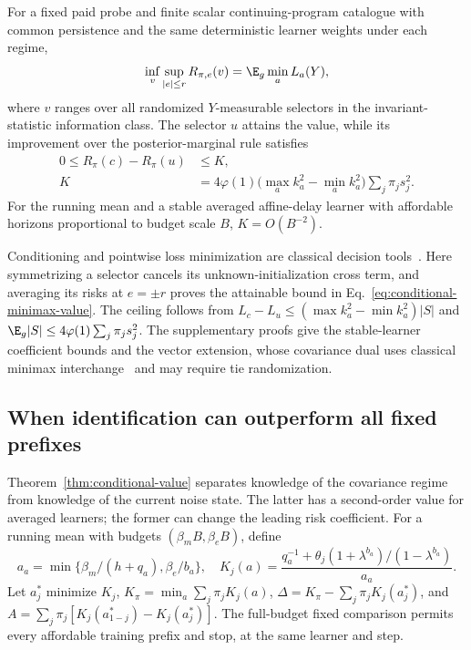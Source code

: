 \begin{theorem}
For a fixed paid probe and finite scalar continuing-program catalogue with common persistence and the same deterministic learner weights under each regime,
\begin{equation}
\inf_v\sup_{|e|\le r}R_{\pi,e}(v)=\E_g\min_aL_a(Y),
\label{eq:conditional-minimax-value}
\end{equation}
where $v$ ranges over all randomized $Y$-measurable selectors in the invariant-statistic information class.
The selector $u$ attains the value, while its improvement over the posterior-marginal rule satisfies
\begin{align}
0\le R_\pi(c)-R_\pi(u)&\le K,\nonumber\\
K&=4\varphi(1)\bigl(\max_ak_a^2-\min_ak_a^2\bigr)\sum_j\pi_js_j^2.
\label{eq:state-selection-ceiling-main}
\end{align}
For the running mean and a stable averaged affine-delay learner with affordable horizons proportional to budget scale $B$, $K=O(B^{-2})$.
\label{thm:conditional-value}
\end{theorem}

Conditioning and pointwise loss minimization are classical decision tools~\cite{moustakides2012joint,vasconcelos2020observation,reinhard2026minimax}.
Here symmetrizing a selector cancels its unknown-initialization cross term, and averaging its risks at $e=\pm r$ proves the attainable bound in Eq.~\eqref{eq:conditional-minimax-value}.
The ceiling follows from $L_c-L_u\le(\max k_a^2-\min k_a^2)|S|$ and $\E_g|S|\le4\varphi(1)\sum_j\pi_js_j^2$.
The supplementary proofs give the stable-learner coefficient bounds and the vector extension, whose covariance dual uses classical minimax interchange~\cite{sion1958minimax} and may require tie randomization.

\subsection{When identification can outperform all fixed prefixes}
Theorem~\ref{thm:conditional-value} separates knowledge of the covariance regime from knowledge of the current noise state.
The latter has a second-order value for averaged learners; the former can change the leading risk coefficient.
For a running mean with budgets $(\beta_mB,\beta_eB)$, define
\[
a_a=\min\{\beta_m/(h+q_a),\beta_e/b_a\},\quad
K_j(a)=\frac{q_a^{-1}+\theta_j(1+\lambda^{b_a})/(1-\lambda^{b_a})}{a_a}.
\]
Let $a_j^*$ minimize $K_j$, $K_\pi=\min_a\sum_j\pi_jK_j(a)$,
$\Delta=K_\pi-\sum_j\pi_jK_j(a_j^*)$, and
$A=\sum_j\pi_j[K_j(a_{1-j}^*)-K_j(a_j^*)]$.
The full-budget fixed comparison permits every affordable training prefix and stop, at the same learner and step.

